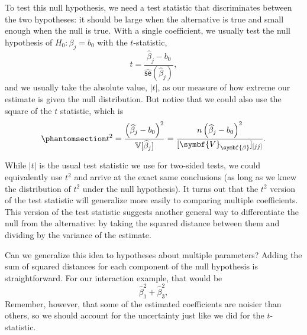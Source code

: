 \documentclass[
  13pt,
  letterpaper,
  DIV=11,
  numbers=noendperiod]{scrreprt}
\newcommand{\mb}{\symbf}
\newcommand{\V}{\mathbb{V}}
\newcommand{\se}{\textsf{se}}
\newcommand{\bfbeta}{\mb{\beta}}
\theoremstyle{plain}
\theoremstyle{definition}
\theoremstyle{definition}
\theoremstyle{remark}
\begin{document}
To test this null hypothesis, we need a test statistic that
discriminates between the two hypotheses: it should be large when the
alternative is true and small enough when the null is true. With a
single coefficient, we usually test the null hypothesis of
\(H_0: \beta_j = b_0\) with the \(t\)-statistic, \[ 
t = \frac{\widehat{\beta}_{j} - b_{0}}{\widehat{\se}(\widehat{\beta}_{j})},
\] and we usually take the absolute value, \(|t|\), as our measure of
how extreme our estimate is given the null distribution. But notice that
we could also use the square of the \(t\) statistic, which is
\begin{equation}\phantomsection\label{eq-squared-t}{ 
t^{2} = \frac{\left(\widehat{\beta}_{j} - b_{0}\right)^{2}}{\V[\widehat{\beta}_{j}]} = \frac{n\left(\widehat{\beta}_{j} - b_{0}\right)^{2}}{[\mb{V}_{\bfbeta}]_{[jj]}}. 
}\end{equation}

While \(|t|\) is the usual test statistic we use for two-sided tests, we
could equivalently use \(t^2\) and arrive at the exact same conclusions
(as long as we knew the distribution of \(t^2\) under the null
hypothesis). It turns out that the \(t^2\) version of the test statistic
will generalize more easily to comparing multiple coefficients. This
version of the test statistic suggests another general way to
differentiate the null from the alternative: by taking the squared
distance between them and dividing by the variance of the estimate.

Can we generalize this idea to hypotheses about multiple parameters?
Adding the sum of squared distances for each component of the null
hypothesis is straightforward. For our interaction example, that would
be \[ 
\widehat{\beta}_1^2 + \widehat{\beta}_3^2, 
\] Remember, however, that some of the estimated coefficients are
noisier than others, so we should account for the uncertainty just like
we did for the \(t\)-statistic.
\end{document}
